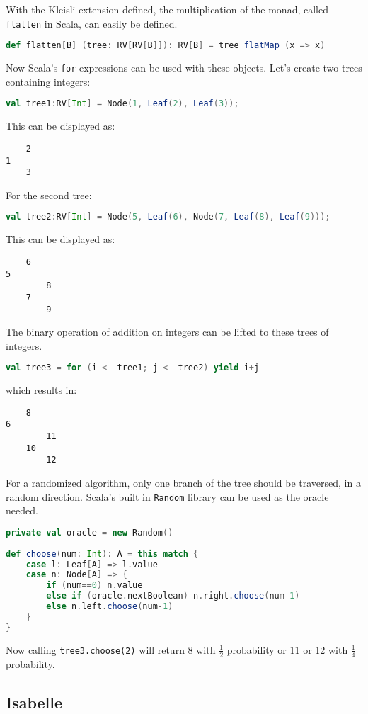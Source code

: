With the Kleisli extension defined, the multiplication of the monad, called \texttt{flatten} in Scala, can easily be defined.
\begin{lstlisting}[language=Scala]
def flatten[B] (tree: RV[RV[B]]): RV[B] = tree flatMap (x => x)
\end{lstlisting}
Now Scala's \texttt{for} expressions can be used with these objects.  Let's create two trees containing integers:
\begin{lstlisting}[language=Scala]
val tree1:RV[Int] = Node(1, Leaf(2), Leaf(3));
\end{lstlisting}
This can be displayed as:
\begin{verbatim}
    2
1
    3
\end{verbatim}
For the second tree:
\begin{lstlisting}[language=Scala]
val tree2:RV[Int] = Node(5, Leaf(6), Node(7, Leaf(8), Leaf(9)));
\end{lstlisting}
This can be displayed as:
\newpage
\begin{verbatim}
    6
5
        8
    7
        9
\end{verbatim}
The binary operation of addition on integers can be lifted to these trees of integers.
\begin{lstlisting}[language=Scala]
val tree3 = for (i <- tree1; j <- tree2) yield i+j
\end{lstlisting}
which results in:
\begin{verbatim}
    8
6
        11
    10
        12
\end{verbatim}
For a randomized algorithm, only one branch of the tree should be traversed, in a random direction.  Scala's built in \texttt{Random} library can be used as the oracle needed.
\begin{lstlisting}[language=Scala]
private val oracle = new Random()
  
def choose(num: Int): A = this match {
    case l: Leaf[A] => l.value
    case n: Node[A] => {
        if (num==0) n.value
        else if (oracle.nextBoolean) n.right.choose(num-1)
        else n.left.choose(num-1)
    }
}
\end{lstlisting}
Now calling \texttt{tree3.choose(2)} will return 8 with $\frac{1}{2}$ probability or 11 or 12 with $\frac{1}{4}$ probability.

\subsection{Isabelle}

